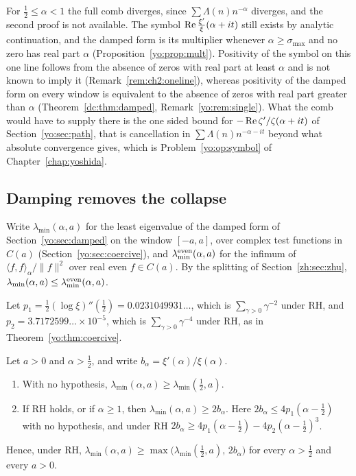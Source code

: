For $\frac12\le\alpha<1$ the full comb diverges, since $\sum\Lambda(n)n^{-\alpha}$ diverges, and the second proof is not available. The symbol $\operatorname{Re}\frac{\xi'}\xi(\alpha+it)$ still exists by analytic continuation, and the damped form is its multiplier whenever $\alpha\ge\sigma_{\max}$ and no zero has real part $\alpha$ (Proposition~\ref{yo:prop:mult}). Positivity of the symbol on this one line follows from the absence of zeros with real part at least $\alpha$ and is not known to imply it (Remark~\ref{rem:ch2:oneline}), whereas positivity of the damped form on every window is equivalent to the absence of zeros with real part greater than $\alpha$ (Theorem~\ref{dc:thm:damped}, Remark~\ref{yo:rem:single}). What the comb would have to supply there is the one sided bound for $-\operatorname{Re}\zeta'/\zeta(\alpha+it)$ of Section~\ref{yo:sec:path}, that is cancellation in $\sum\Lambda(n)n^{-\alpha-it}$ beyond what absolute convergence gives, which is Problem~\ref{yo:op:symbol} of Chapter~\ref{chap:yoshida}.

\subsection{Damping removes the collapse}\label{zh:sec:damp}

Write $\lambda_{\min}(\alpha,a)$ for the least eigenvalue of the damped form of Section~\ref{yo:sec:damped} on the window $[-a,a]$, over complex test functions in $C(a)$ (Section~\ref{yo:sec:coercive}), and $\lambda_{\min}^{\rm even}(\alpha,a)$ for the infimum of $\langle f,f\rangle_\alpha/\|f\|^2$ over real even $f\in C(a)$. By the splitting of Section~\ref{zh:sec:zhu}, $\lambda_{\min}(\alpha,a)\le\lambda_{\min}^{\rm even}(\alpha,a)$.

Let $p_1=\frac12(\log\xi)''(\frac12)=0.0231049931\ldots$, which is $\sum_{\gamma>0}\gamma^{-2}$ under RH, and $p_2=3.7172599\ldots\times10^{-5}$, which is $\sum_{\gamma>0}\gamma^{-4}$ under RH, as in Theorem~\ref{yo:thm:coercive}.

\begin{theorem}\label{zh:thm:twoparam}
Let $a>0$ and $\alpha>\frac12$, and write $b_\alpha=\xi'(\alpha)/\xi(\alpha)$.
\begin{enumerate}
\item[(i)] With no hypothesis, $\lambda_{\min}(\alpha,a)\ge\lambda_{\min}(\frac12,a)$.
\item[(ii)] If RH holds, or if $\alpha\ge1$, then $\lambda_{\min}(\alpha,a)\ge2b_\alpha$. Here $2b_\alpha\le4p_1(\alpha-\frac12)$ with no hypothesis, and under RH $2b_\alpha\ge4p_1(\alpha-\frac12)-4p_2(\alpha-\frac12)^3$.
\end{enumerate}
Hence, under RH, $\lambda_{\min}(\alpha,a)\ge\max\bigl(\lambda_{\min}(\tfrac12,a),\,2b_\alpha\bigr)$ for every $\alpha>\frac12$ and every $a>0$.
\end{theorem}

